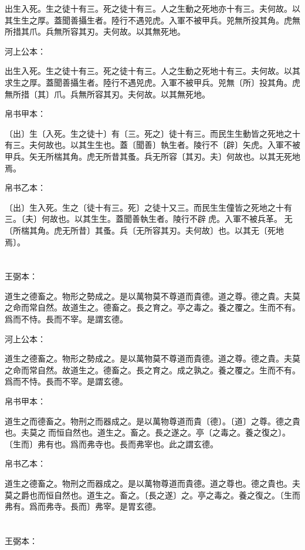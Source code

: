 \documentclass[a5paper]{ctexbook}
\begin{document}
    出生入死。生之徒十有三。死之徒十有三。人之生動之死地亦十有三。夫何故。以其生生之厚。蓋聞善攝生者。陸行不遇兕虎。入軍不被甲兵。兕無所投其角。虎無所措其爪。兵無所容其刃。夫何故。以其無死地。

    河上公本：

    出生入死。生之徒十有三。死之徒十有三。人之生動之死地十有三。夫何故。以其求生之厚。蓋聞善攝生者。陸行不遇兕虎。入軍不被甲兵。兕無〔所〕投其角。虎無所措〔其〕爪。兵無所容其刃。夫何故。以其無死地。

    帛书甲本：

    〔出〕生〔入死。生之徒十〕有〔三。死之〕徒十有三。而民生生動皆之死地之十有三。夫何故也。以其生生也。蓋〔聞善〕執生者。陵行不〔辟〕矢虎。入軍不被甲兵。矢无所椯其角。虎无所昔其蚤。兵无所容〔其刃。夫〕何故也。以其无死地焉。

    帛书乙本：

    〔出〕生入死。生之〔徒十有三。死〕之徒十又三。而民生生僮皆之死地之十有三。〔夫〕何故也。以其生生。蓋聞善執生者。陵行不辟𧰽虎。入軍不被兵革。𧰽无〔所椯其角。虎无所昔〕其蚤。兵〔无所容其刃。夫何故〕也。以其无〔死地焉〕。

    \chapter{}
    王弼本：

    道生之德畜之。物形之勢成之。是以萬物莫不尊道而貴德。道之尊。德之貴。夫莫之命而常自然。故道生之。德畜之。長之育之。亭之毒之。養之覆之。生而不有。爲而不恃。長而不宰。是謂玄德。

    河上公本：

    道生之德畜之。物形之勢成之。是以萬物莫不尊道而貴德。道之尊。德之貴。夫莫之命而常自然。故道生之。德畜之。長之育之。成之孰之。養之覆之。生而不有。爲而不恃。長而不宰。是謂玄德。

    帛书甲本：

    道生之而德畜之。物刑之而器成之。是以萬物尊道而貴〔德〕。〔道〕之尊。德之貴也。夫莫之𡬠而恒自然也。道生之。畜之。長之遂之。亭〔之毒之。養之復之〕。〔生而〕弗有也。爲而弗寺也。長而弗宰也。此之謂玄德。

    帛书乙本：

    道生之德畜之。物刑之而器成之。是以萬物尊道而貴德。道之尊也。德之貴也。夫莫之爵也而恒自然也。道生之。畜之。〔長之遂〕之。亭之毒之。養之復之。〔生而弗有。爲而弗寺。長而〕弗宰。是胃玄德。

    \chapter{}
    王弼本：
\end{document}

